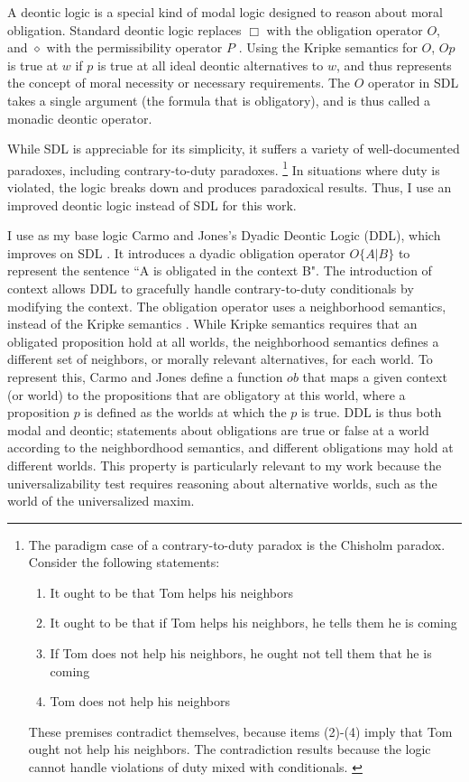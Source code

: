 \begin{isabellebody}
\begin{isamarkuptext}
A deontic logic is a special kind of modal logic designed to reason about moral obligation. Standard deontic
logic replaces $\Box$ with the obligation operator
$O$, and $\diamond$ with the permissibility operator $P$ \citep{cresswell}. Using the Kripke semantics for $O$, $O p$ 
is true at $w$ if $p$ is true at all  ideal deontic alternatives to $w$, and thus represents the 
concept of moral necessity or necessary requirements. The $O$ operator in SDL
takes a single argument (the formula that is obligatory), and is thus called a monadic deontic operator.

 While SDL is appreciable for its simplicity, it suffers a variety of well-documented paradoxes, 
including contrary-to-duty paradoxes. \footnote{The paradigm case of a contrary-to-duty paradox is the 
Chisholm paradox. Consider the following statements: \begin{enumerate}
\item It ought to be that Tom helps his neighbors
\item It ought to be that if Tom helps his neighbors, he tells them he is coming
\item If Tom does not help his neighbors, he ought not tell them that he is coming
\item Tom does not help his neighbors
\end{enumerate} 
These premises contradict themselves, because items (2)-(4) imply that Tom ought not help his neighbors. The 
contradiction results because the logic cannot handle violations of duty mixed with
conditionals. \citep{chisholm, ctd}
} In situations where duty is violated, the logic breaks down 
and produces paradoxical results. Thus, I use an improved deontic logic instead of SDL for this work.%
\end{isamarkuptext}\isamarkuptrue%
%
\begin{isamarkuptext}%
I use as my base logic Carmo and Jones's Dyadic Deontic Logic (DDL), which improves on SDL \citep{CJDDL}. 
It introduces a dyadic obligation operator $O\{A \vert B\}$ 
to represent the sentence ``A is obligated in the context B". The introduction of context allows DDL to
gracefully handle contrary-to-duty conditionals by modifying the context. The obligation operator uses 
a neighborhood semantics, instead of the Kripke semantics \citep{neighborhood1, neighborhood2}. While Kripke
semantics requires that an obligated proposition hold at all worlds, the neighborhood semantics defines
a different set of neighbors, or morally relevant alternatives, for each world. To represent this,
Carmo and Jones define a function $ob$ that maps a given context (or world) to the propositions 
that are obligatory at this world, where a proposition $p$ is defined as 
the worlds at which the $p$ is true. DDL is thus both modal and deontic; statements about obligations are
true or false at a world according to the neighbordhood 
semantics, and different obligations may hold at different worlds. This property is particularly relevant to my work because the universalizability test
requires reasoning about alternative worlds, such as the world of the universalized maxim.


\end{isamarkuptext}
\end{isabellebody}
